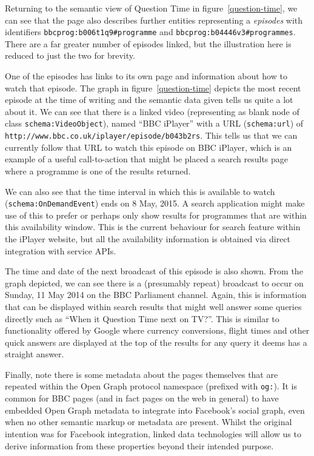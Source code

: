Returning to the semantic view of Question Time in figure~\ref{question-time},
we can see that the page also describes further entities representing
a \emph{episodes} with identifiers \texttt{bbcprog:b006t1q9\#programme}
and \texttt{bbcprog:b04446v3\#programmes}. There are a far greater
number of episodes linked, but the illustration here is reduced to
just the two for brevity.

One of the episodes has links to its own page and information
about how to watch that episode. The graph in figure~\ref{question-time}
depicts the most recent episode at the time of writing and the
semantic data given tells us quite a lot about it. We can see
that there is a linked video (representing as blank node of
class \texttt{schema:VideoObject}), named ``BBC iPlayer'' with
a URL (\texttt{schema:url}) of \texttt{http://www.bbc.co.uk/iplayer/episode/b043b2rs}.
This tells us that we can currently follow that URL to watch
this episode on BBC iPlayer, which is an example of a useful
call-to-action that might be placed a search results page where
a programme is one of the results returned.

We can also see that the time interval in which this is available
to watch (\texttt{schema:OnDemandEvent}) ends on 8 May, 2015. A
search application might make use of this to prefer or perhaps
only show results for programmes that are within this availability
window. This is the current behaviour for search feature within
the iPlayer website, but all the availability information is
obtained via direct integration with service APIs.

The time and date of the next broadcast of this episode is also shown.
From the graph depicted, we can see there is a (presumably repeat)
broadcast to occur on Sunday, 11 May 2014 on the BBC Parliament
channel. Again, this is information that can be displayed within
search results that might well answer some queries directly
such as ``When it Question Time next on TV?''. This is similar
to functionality offered by Google where currency conversions,
flight times and other quick answers are displayed at the top
of the results for any query it deems has a straight answer.

Finally, note there is some metadata about the pages themselves
that are repeated within the Open Graph protocol namespace
(prefixed with \texttt{og:}). It is common for BBC pages (and
in fact pages on the web in general) to have embedded Open
Graph metadata to integrate into Facebook's social graph, even
when no other semantic markup or metadata are present. Whilst
the original intention was for Facebook integration, linked
data technologies will allow us to derive information from
these properties beyond their intended purpose.

